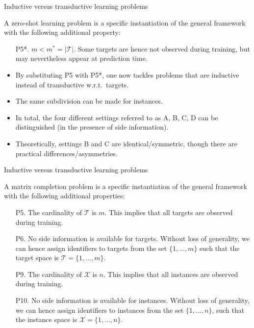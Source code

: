 \documentclass[]{beamer}
\begin{document}
\begin{frame}{Inductive versus transductive learning problems}
\begin{definition}
A zero-shot learning problem is a specific instantiation of the general framework with the following additional property: 
\begin{enumerate}
\item[P5*.] $m < m^* = |\mathcal{T}|$. Some targets are hence not observed during training, but may nevertheless appear at prediction time.  
\end{enumerate}
\end{definition}
\pause

\begin{itemize}
\item By substituting P5 with P5*, one now tackles problems that are inductive instead of transductive w.r.t.\ targets. 
\item The same subdivision can be made for instances. 
\item In total, the four different settings referred to as A, B, C, D can be distinguished (in the presence of side information). %
\item Theoretically, settings B and C are identical/symmetric, though there are practical differences/asymmetries. 
\end{itemize}
\end{frame}




\begin{frame}{Inductive versus transductive learning problems}
\begin{definition}
A matrix completion problem is a specific instantiation of the general framework with the following additional properties: 
\begin{enumerate}
\item[P5.] The cardinality of $\mathcal{T}$ is $m$. This implies that all targets are observed during training. 
\item[P6.] No side information is available for targets. Without loss of generality, we can hence assign identifiers to targets from the set $\{1,...,m\}$ such that the target space is $\mathcal{T} = \{1,...,m\}$.
\item[P9.] The cardinality of $\mathcal{X}$ is $n$. This implies that all instances are observed during training. 
\item[P10.] No side information is available for instances. Without loss of generality, we can hence assign identifiers to instances from the set $\{1,...,n\}$, such that the instance space is $\mathcal{X} = \{1,...,n\}$.
\end{enumerate}
\end{definition}
\end{frame}
\end{document}
